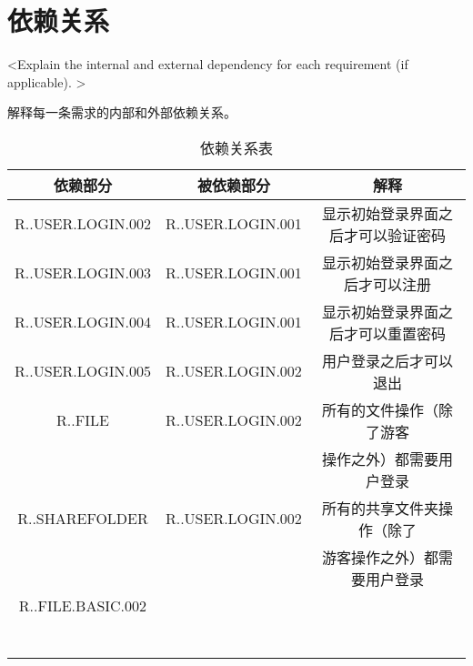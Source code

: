 \chapter{依赖关系}
<Explain the internal and external dependency for each requirement (if applicable). >

解释每一条需求的内部和外部依赖关系。

\begin{table}[htbp]
\centering
\caption{依赖关系表} \label{tab:simpletable}
\begin{tabular}{|c|c|c|}
    \hline
    依赖部分 & 被依赖部分 & 解释  \\
    \hline
    R..USER.LOGIN.002 & R..USER.LOGIN.001 & 显示初始登录界面之后才可以验证密码 \\
    \hline
    R..USER.LOGIN.003 & R..USER.LOGIN.001 & 显示初始登录界面之后才可以注册 \\
    \hline
    R..USER.LOGIN.004 & R..USER.LOGIN.001 & 显示初始登录界面之后才可以重置密码 \\
    \hline
    R..USER.LOGIN.005 & R..USER.LOGIN.002 & 用户登录之后才可以退出 \\
    \hline
    R..FILE & R..USER.LOGIN.002 & 所有的文件操作（除了游客\\ &  &操作之外）都需要用户登录 \\ 
    \hline
    R..SHAREFOLDER & R..USER.LOGIN.002 & 所有的共享文件夹操作（除了\\ &  &游客操作之外）都需要用户登录\\
    \hline
    R..FILE.BASIC.002 &  & \\
    \hline
     &  & \\
    \hline
     &  & \\
    \hline
     &  & \\
    \hline
     &  & \\
    \hline
     &  & \\
    \hline
     &  & \\
    \hline
     &  & \\
    
\end{tabular}
\end{table} 
